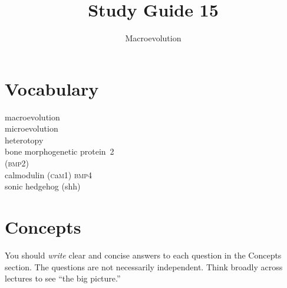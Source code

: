 \documentclass[letterpaper]{tufte-handout}
\title{Study Guide 15\hfill}
\author{Macroevolution}
\date{} %
\begin{document}
\maketitle	%

\section{Vocabulary}

\begin{multicols}{2}
macroevolution \\
microevolution \\
heterotopy \\
bone morphogenetic protein\ 2\\\hspace{1em}(\textsc{bmp2})\\
calmodulin (\textsc{c}a\textsc{m1})
\textsc{bmp4}\\
sonic hedgehog (shh)\\

\end{multicols}


\section{Concepts}

You should \emph{write} clear and concise answers to each question in the Concepts section.  The questions are not necessarily independent.  Think broadly across lectures to see ``the big picture.'' 
\end{document}
